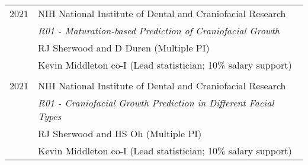 \begin{longtable}{@{}lX@{}}
    2021 & NIH National Institute of Dental and Craniofacial Research\\
         & \emph{R01 - Maturation-based Prediction of Craniofacial Growth}\\
         & RJ Sherwood and D Duren (Multiple PI)\\
         & Kevin Middleton co-I (Lead statistician; 10\% salary support)\\[0.5pc]
         \\
    2021 & NIH National Institute of Dental and Craniofacial Research\\
         & \emph{R01 - Craniofacial Growth Prediction in Different Facial Types}\\
         & RJ Sherwood and HS Oh (Multiple PI)\\
         & Kevin Middleton co-I (Lead statistician; 10\% salary support)\\[0.5pc]
\end{longtable}

